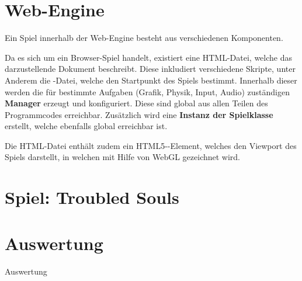 \part{Web-Engine}

Ein Spiel innerhalb der Web-Engine besteht aus verschiedenen Komponenten.

Da es sich um ein Browser-Spiel handelt, existiert eine HTML-Datei, welche das darzustellende Dokument beschreibt. Diese inkludiert verschiedene Skripte, unter Anderem die -Datei, welche den Startpunkt des Spiels bestimmt. Innerhalb dieser werden die für bestimmte Aufgaben (Grafik, Physik, Input, Audio) zuständigen \textbf{Manager} erzeugt und konfiguriert. Diese sind global aus allen Teilen des Programmcodes erreichbar. Zusätzlich wird eine \textbf{Instanz der Spielklasse} erstellt, welche ebenfalls global erreichbar ist.

Die HTML-Datei enthält zudem ein HTML5--Element, welches den Viewport des Spiels darstellt, in welchen mit Hilfe von WebGL gezeichnet wird.













\part{Spiel: Troubled Souls}



\part{Auswertung}



Auswertung